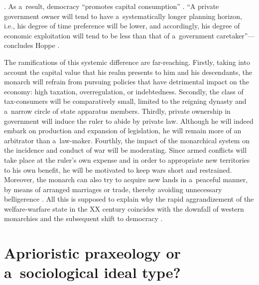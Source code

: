 \parencite[][pp.45–46]{hoppe_democracy_2007}. %
 As a~result, democracy ``promotes capital consumption'' 
\parencite[][p.119]{hoppe_short_2015}. %
 ``A private government owner will tend to have a~systematically longer planning horizon, i.e., his degree of time preference will be lower, and accordingly, his degree of economic exploitation will tend to be less than that of a~government caretaker''---concludes Hoppe 
\parencite*[][p.46]{hoppe_democracy_2007}.%




The ramifications of this systemic difference are far-reaching. Firstly, taking into account the capital value that his realm presents to him and his descendants, the monarch will refrain from pursuing policies that have detrimental impact on the economy: high taxation, overregulation, or indebtedness. Secondly, the class of tax-consumers will be comparatively small, limited to the reigning dynasty and a~narrow circle of state apparatus members. Thirdly, private ownership in government will induce the ruler to abide by private law. Although he will indeed embark on production and expansion of legislation, he will remain more of an arbitrator than a~law-maker. Fourthly, the impact of the monarchical system on the incidence and conduct of war will be moderating. Since armed conflicts will take place at the ruler's own expense and in order to appropriate new territories to his own benefit, he will be motivated to keep wars short and restrained. Moreover, the monarch can also try to acquire new lands in a~peaceful manner, by means of arranged marriages or trade, thereby avoiding unnecessary belligerence 
\parencite[][pp.19–23]{}. %
 All this is supposed to explain why the rapid aggrandizement of the welfare-warfare state in the XX century coincides with the downfall of western monarchies and the subsequent shift to democracy 
\parencite[][pp.50–74]{hoppe_democracy_2007}.%




\section{Aprioristic praxeology or a~sociological ideal type?}

